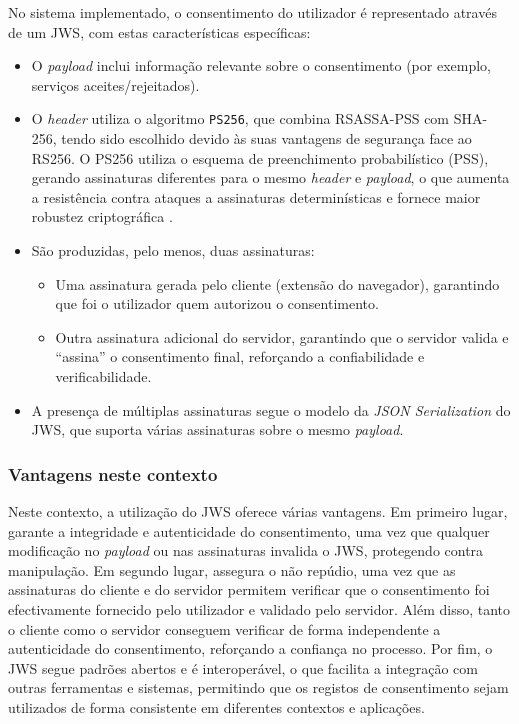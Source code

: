 No sistema implementado, o consentimento do utilizador é representado através de um JWS, com estas características específicas:

\begin{itemize}
  \item O \textit{payload} inclui informação relevante sobre o consentimento (por exemplo, serviços aceites/rejeitados).
  \item O \textit{header} utiliza o algoritmo \texttt{PS256}, que combina RSASSA-PSS com SHA-256, tendo sido escolhido devido às suas vantagens de segurança face ao RS256. O PS256 utiliza o esquema de preenchimento probabilístico (PSS), gerando assinaturas diferentes para o mesmo \textit{header} e \textit{payload}, o que aumenta a resistência contra ataques a assinaturas determinísticas e fornece maior robustez criptográfica \citep{ScottBrady2020}.
  \item São produzidas, pelo menos, duas assinaturas:
    \begin{itemize}
      \item Uma assinatura gerada pelo cliente (extensão do navegador), garantindo que foi o utilizador quem autorizou o consentimento.
      \item Outra assinatura adicional do servidor, garantindo que o servidor valida e “assina” o consentimento final, reforçando a confiabilidade e verificabilidade.
    \end{itemize}
  \item A presença de múltiplas assinaturas segue o modelo da \textit{JSON Serialization} do JWS, que suporta várias assinaturas sobre o mesmo \textit{payload}.
\end{itemize}

\subsubsection{Vantagens neste contexto}

Neste contexto, a utilização do JWS oferece várias vantagens. Em primeiro lugar, garante a integridade e autenticidade do consentimento, uma vez que qualquer modificação no \textit{payload} ou nas assinaturas invalida o JWS, protegendo contra manipulação. 
Em segundo lugar, assegura o não repúdio, uma vez que as assinaturas do cliente e do servidor permitem verificar que o consentimento foi efectivamente fornecido pelo utilizador e validado pelo servidor.
Além disso, tanto o cliente como o servidor conseguem verificar de forma independente a autenticidade do consentimento, reforçando a confiança no processo.
Por fim, o JWS segue padrões abertos e é interoperável, o que facilita a integração com outras ferramentas e sistemas, permitindo que os registos de consentimento sejam utilizados de forma consistente em diferentes contextos e aplicações.

